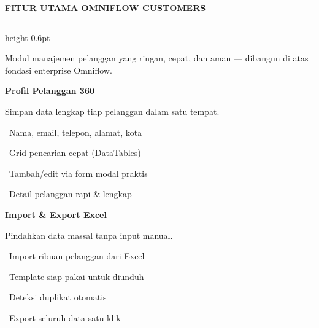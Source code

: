 \documentclass[a4paper]{article}
\newcommand{\sectiontitle}[1]{%
    \vspace{10pt}%
    {\fontsize{13}{16}\selectfont\bfseries\color{BlueDark} #1}\par\vspace{3pt}%
    {\color{BluePrimary}\hrule height 0.6pt}\par\vspace{8pt}%
}
\begin{document}
\sectiontitle{FITUR UTAMA OMNIFLOW CUSTOMERS}

{\fontsize{9.5}{13}\selectfont\color{TextLight} Modul manajemen pelanggan yang ringan, cepat, dan aman --- dibangun di atas fondasi enterprise Omniflow.}

\vspace{6pt}

\noindent
\begin{minipage}[t]{0.485\textwidth}
    \colorbox{BluePrimary}{%
        \begin{minipage}{\dimexpr\textwidth-2\fboxsep\relax}
            {\fontsize{10}{13}\selectfont\bfseries\color{White} Profil Pelanggan 360\textdegree{}}
        \end{minipage}}\par
    \vspace{4pt}
    {\fontsize{9}{12}\selectfont\color{TextDark}%
    Simpan data lengkap tiap pelanggan dalam satu tempat.\par\vspace{3pt}
    \textbullet\ Nama, email, telepon, alamat, kota\par\vspace{2pt}%
    \textbullet\ Grid pencarian cepat (DataTables)\par\vspace{2pt}%
    \textbullet\ Tambah/edit via form modal praktis\par\vspace{2pt}%
    \textbullet\ Detail pelanggan rapi \& lengkap}%

\end{minipage}%
\hfill
\begin{minipage}[t]{0.485\textwidth}
    \colorbox{EmeraldPrimary}{%
        \begin{minipage}{\dimexpr\textwidth-2\fboxsep\relax}
            {\fontsize{10}{13}\selectfont\bfseries\color{White} Import \& Export Excel}
        \end{minipage}}\par
    \vspace{4pt}
    {\fontsize{9}{12}\selectfont\color{TextDark}%
    Pindahkan data massal tanpa input manual.\par\vspace{3pt}
    \textbullet\ Import ribuan pelanggan dari Excel\par\vspace{2pt}%
    \textbullet\ Template siap pakai untuk diunduh\par\vspace{2pt}%
    \textbullet\ Deteksi duplikat otomatis\par\vspace{2pt}%
    \textbullet\ Export seluruh data satu klik}%

\end{minipage}
\end{document}
